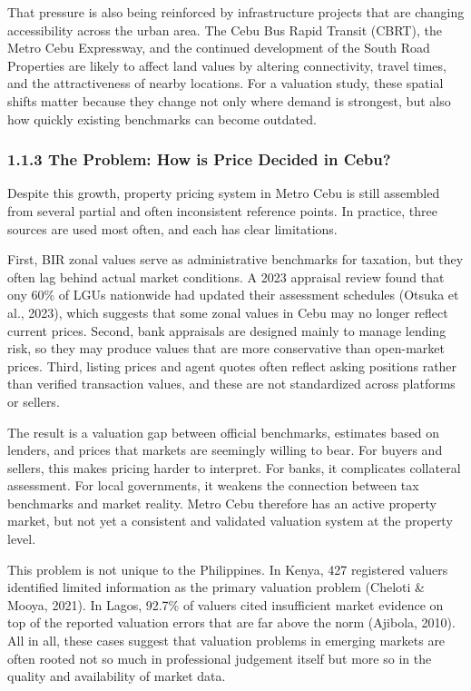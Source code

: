 That pressure is also being reinforced by infrastructure projects that are changing accessibility across the urban area. The Cebu Bus Rapid Transit (CBRT), the Metro Cebu Expressway, and the continued development of the South Road Properties are likely to affect land values by altering connectivity, travel times, and the attractiveness of nearby locations. For a valuation study, these spatial shifts matter because they change not only where demand is strongest, but also how quickly existing benchmarks can become outdated.

\subsubsection{\texorpdfstring{\textbf{1.1.3 The Problem: How is Price Decided in Cebu?}}{1.1.3 The Problem: How is Price Decided in Cebu?}}\label{the-problem-how-is-price-decided-in-cebu}

Despite this growth, property pricing system in Metro Cebu is still assembled from several partial and often inconsistent reference points. In practice, three sources are used most often, and each has clear limitations.

First, BIR zonal values serve as administrative benchmarks for taxation, but they often lag behind actual market conditions. A 2023 appraisal review found that ony 60\% of LGUs nationwide had updated their assessment schedules (Otsuka et al., 2023), which suggests that some zonal values in Cebu may no longer reflect current prices. Second, bank appraisals are designed mainly to manage lending risk, so they may produce values that are more conservative than open-market prices. Third, listing prices and agent quotes often reflect asking positions rather than verified transaction values, and these are not standardized across platforms or sellers.

The result is a valuation gap between official benchmarks, estimates based on lenders, and prices that markets are seemingly willing to bear. For buyers and sellers, this makes pricing harder to interpret. For banks, it complicates collateral assessment. For local governments, it weakens the connection between tax benchmarks and market reality. Metro Cebu therefore has an active property market, but not yet a consistent and validated valuation system at the property level.

This problem is not unique to the Philippines. In Kenya, 427 registered valuers identified limited information as the primary valuation problem (Cheloti \& Mooya, 2021). In Lagos, 92.7\% of valuers cited insufficient market evidence on top of the reported valuation errors that are far above the norm (Ajibola, 2010). All in all, these cases suggest that valuation problems in emerging markets are often rooted not so much in professional judgement itself but more so in the quality and availability of market data.

